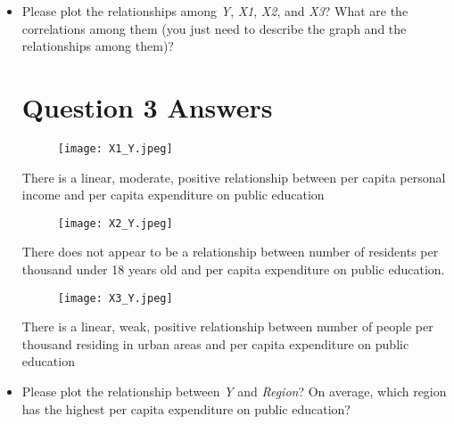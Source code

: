 \documentclass[12pt,letterpaper]{article}
\begin{document}
	\begin{itemize}
		
		\item
		Please plot the relationships among \emph{Y}, \emph{X1}, \emph{X2}, and \emph{X3}? What are the correlations among them (you just need to describe the graph and the relationships among them)?
		
		\section{Question 3 Answers}
			
		\vspace{.5cm}
		
	\begin{figure} [H]
		\texttt{[image: X1\_Y.jpeg]}
	\end{figure}
		\vspace{.5cm}	
		\noindent There is a linear, moderate, positive relationship between per capita personal income and per capita expenditure on public education
		\vspace{.5cm}
		
			
	\begin{figure}[H]
		\texttt{[image: X2\_Y.jpeg]}
\end{figure}
		\vspace{.5cm}
		\noindent There does not appear to be a relationship between number of residents per thousand under 18 years old and per capita expenditure on public education.
		\vspace{.5cm}
		
		
		\begin{figure}[H]
			\texttt{[image: X3\_Y.jpeg]}
	\end{figure}
		\vspace{.5cm}
\noindent There is a linear, weak, positive relationship between number of people per thousand residing in urban areas  and per capita expenditure on public education
\vspace{.5cm}	
		\vspace{.5cm}
		
		\item
		Please plot the relationship between \emph{Y} and \emph{Region}? On average, which region has the highest per capita expenditure on public education?
		

\end{itemize}
\end{document}
